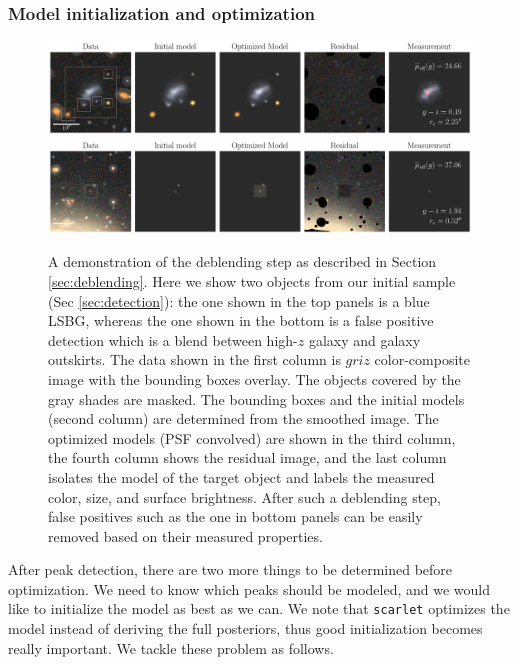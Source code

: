\documentclass[twocolumn,astrosymb,twocolappendix]{aastex631}
\newcommand{\code}[1]{\texttt{#1}}
\begin{document}
\begin{CJK*}{UTF8}{gbsn}
\subsubsection{Model initialization and optimization}

\begin{figure}
	\vbox{ 
		\centering
		\includegraphics[width=1\linewidth]{vanilla_scarlet_demo.pdf}
		\includegraphics[width=1\linewidth]{vanilla_scarlet_demo2.pdf}
	}
	\caption{A demonstration of the deblending step as described in Section \ref{sec:deblending}. Here we show two objects from our initial sample (Sec \ref{sec:detection}): the one shown in the top panels is a blue LSBG, whereas the one shown in the bottom is a false positive detection which is a blend between high-$z$ galaxy and galaxy outskirts. The data shown in the first column is $griz$ color-composite image with the bounding boxes overlay. The objects covered by the gray shades are masked. The bounding boxes and the initial models (second column) are determined from the smoothed image. The optimized models (PSF convolved) are shown in the third column, the fourth column shows the residual image, and the last column isolates the model of the target object and labels the measured color, size, and surface brightness. After such a deblending step, false positives such as the one in bottom panels can be easily removed based on their measured properties. 
	}
	\label{fig:vanilla_scarlet_demo}
\end{figure}

After peak detection, there are two more things to be determined before optimization. We need to know which peaks should be modeled, and we would like to initialize the model as best as we can. We note that \code{scarlet} optimizes the model instead of deriving the full posteriors, thus good initialization becomes really important. We tackle these problem as follows. 


\end{CJK*}
\end{document}
